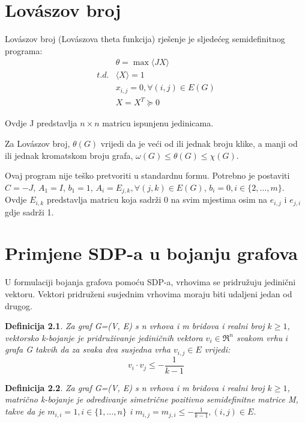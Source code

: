 \documentclass[diplomskirad]{fer}
\newtheorem{definicija}{Definicija}
\begin{document}
\chapter{Lovászov broj}
\label{pog:lovaszov_broj}
Lovászov broj (Lovászova theta funkcija) rješenje je sljedećeg semidefinitnog programa:
\begin{equation}
  \begin{split}
    & \theta = \max \langle JX \rangle \\
    t.d. & \langle X \rangle = 1 \\
         & x_{i,j} = 0, \forall (i,j) \in E(G) \\
         & X=X^T \succeq 0 
  \end{split}
\end{equation}

Ovdje J predstavlja $n \times n$ matricu ispunjenu jedinicama.


Za Lovászov broj, $ \theta(G) $ vrijedi da je veći od ili jednak broju klike, a manji od ili jednak kromatskom broju grafa, 
$\omega(G) \leq \theta(G) \leq \chi(G)$. \cite{1055985}

Ovaj program nije teško pretvoriti u standardnu formu. Potrebno je postaviti $C = -J$, $A_1 = I$, $b_1 = 1$,
$A_i = E_{j,k}, \forall (j,k) \in E(G)$, $b_i = 0, i \in \{2, \dots, m\}$. Ovdje $E_{i,k}$ predstavlja matricu koja sadrži 0 na
svim mjestima osim na $e_{i,j}$ i $e_{j, i}$ gdje sadrži 1.


\chapter{Primjene SDP-a u bojanju grafova}
\label{pog:primjene_SDP-a_u_bojanju_grafova}

U formulaciji bojanja grafova pomoću SDP-a, vrhovima se pridružuju jedinični vektoru. Vektori pridruženi susjednim vrhovima moraju
biti udaljeni jedan od drugog.

\begin{definicija}
  Za graf G=(V, E) s n vrhova i m bridova i realni broj $k \geq 1$, vektorsko k-bojanje je pridruživanje jediničnih
  vektora $v_i \in \Re^n$ svakom vrhu $i$ grafa G takvih da za svaka dva susjedna vrha $v_{i,j} \in E$ vrijedi:
  \begin{equation}
    v_i \cdot v_j \leq - \frac{1}{k-1}
  \end{equation}
\end{definicija} \cite{karger1998approximategraphcoloringsemidefinite}

\begin{definicija}
  Za graf G=(V, E) s n vrhova i m bridova i realni broj $k \geq 1$, matrično k-bojanje je određivanje simetrične pozitivno semidefinitne matrice M,
  takve da je $m_{i,i} = 1, i \in \{1, \dots, n\}$ i $m_{i,j} = m_{j,i} \leq - \frac{1}{k-1}, (i, j) \in E$.
\end{definicija}
\end{document}
